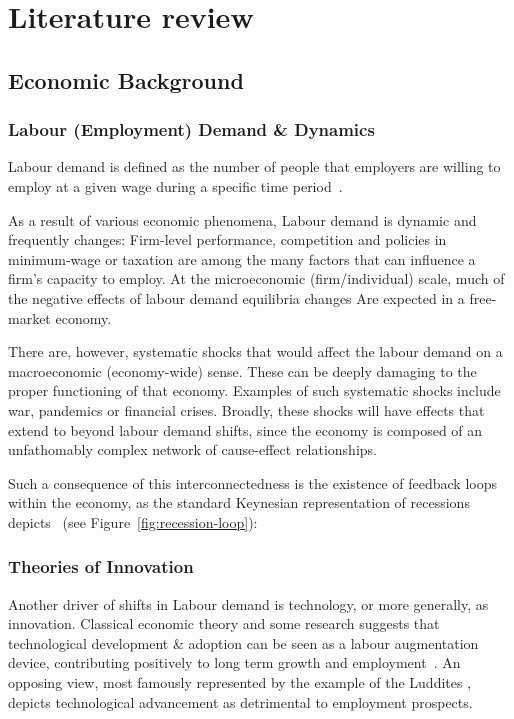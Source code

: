 
\chapter{Literature review}

\section{Economic Background}
\subsection{Labour (Employment) Demand \& Dynamics}

Labour demand is defined as the number of people that employers are willing to employ at a given wage during a specific time period~\textcolor{red}{\cite{TODO}}.

As a result of various economic phenomena, Labour demand is dynamic and frequently changes:
Firm-level performance, competition and policies in minimum-wage or taxation are among the many factors that can influence a firm's capacity to employ.
At the microeconomic (firm/individual) scale, much of the negative effects of labour demand equilibria changes Are expected in a free-market economy.

There are, however, systematic shocks that would affect the labour demand on a macroeconomic (economy-wide) sense. These can be deeply damaging to the proper functioning of that economy.
Examples of such systematic shocks include war, pandemics or financial crises.
Broadly, these shocks will have effects that extend to beyond labour demand shifts, since the economy is composed of an unfathomably complex network of cause-effect relationships.

Such a consequence of this interconnectedness is the existence of feedback loops within the economy, as the standard Keynesian representation of recessions depicts~\cite{mankiw2000macroeconomics} (see Figure~\ref{fig:recession-loop}):



\subsection{Theories of Innovation}

Another driver of shifts in Labour demand is technology, or more generally, as innovation. Classical economic theory and some research suggests that technological development \& adoption can be seen as a labour augmentation device, contributing positively to long term growth and employment~\cite{mankiw2000macroeconomics,ross_2024_LabourMarket}.
An opposing view, most famously represented by the example of the Luddites \cite{_2025_LudditeIndustrial}, depicts technological advancement as detrimental to employment prospects.

